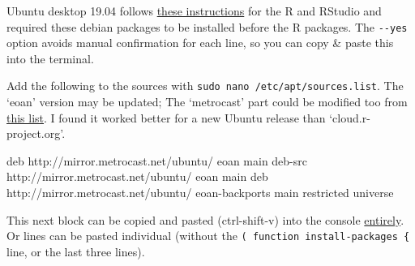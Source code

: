 \documentclass[]{book}
\newenvironment{Shaded}{\begin{snugshade}}{\end{snugshade}}
\newcommand{\ExtensionTok}[1]{#1}
\newcommand{\NormalTok}[1]{#1}
\begin{document}
Ubuntu desktop 19.04 follows \href{https://askubuntu.com/a/862520/153921}{these instructions} for the R and RStudio and required these debian packages to be installed before the R packages. The \texttt{-\/-yes} option avoids manual confirmation for each line, so you can copy \& paste this into the terminal.

Add the following to the sources with \texttt{sudo\ nano\ /etc/apt/sources.list}. The `eoan' version may be updated; The `metrocast' part could be modified too from \href{https://launchpad.net/ubuntu/+archivemirrors}{this list}. I found it worked better for a new Ubuntu release than `cloud.r-project.org'.

\begin{Shaded}
\begin{Highlighting}[]
\ExtensionTok{deb}\NormalTok{ http://mirror.metrocast.net/ubuntu/ eoan main }
\ExtensionTok{deb-src}\NormalTok{ http://mirror.metrocast.net/ubuntu/ eoan main }
\ExtensionTok{deb}\NormalTok{ http://mirror.metrocast.net/ubuntu/ eoan-backports main restricted universe}
\end{Highlighting}
\end{Shaded}

This next block can be copied and pasted (ctrl-shift-v) into the console \href{https://stackoverflow.com/a/43164204}{entirely}. Or lines can be pasted individual (without the \texttt{(\ function\ install-packages\ \{} line, or the last three lines).
\end{document}
